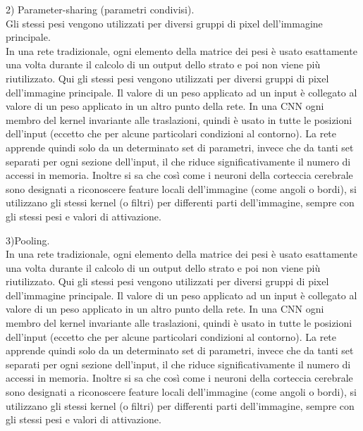 2) Parameter-sharing (parametri condivisi). \\
Gli stessi pesi vengono utilizzati per diversi gruppi di pixel dell’immagine principale.\\
In una rete tradizionale, ogni elemento della matrice dei pesi è usato esattamente
 una volta durante il calcolo di un output dello strato e poi non viene più riutilizzato. Qui gli stessi pesi vengono utilizzati per diversi gruppi di pixel dell’immagine principale. Il valore di un peso applicato ad un input è collegato al valore di un peso applicato in un altro punto della rete. In una CNN ogni membro del kernel invariante alle traslazioni, quindi è usato in tutte le posizioni dell’input (eccetto che per alcune particolari condizioni al contorno). La rete apprende quindi solo da un determinato set di parametri, invece che da tanti set separati per ogni sezione dell’input, il che riduce significativamente il numero di accessi in memoria.  Inoltre si sa che così come i neuroni della corteccia cerebrale sono designati a riconoscere feature locali dell’immagine (come angoli o bordi), si utilizzano gli stessi kernel (o filtri) per differenti parti dell’immagine, sempre con gli stessi pesi e valori di attivazione. 

3)Pooling.\\
In una rete tradizionale, ogni elemento della matrice dei pesi è usato esattamente una volta durante il calcolo di un output dello strato e poi non viene più riutilizzato. Qui gli stessi pesi vengono utilizzati per diversi gruppi di pixel dell’immagine principale. Il valore di un peso applicato ad un input è collegato al valore di un peso applicato in un altro punto della rete. In una CNN ogni membro del kernel invariante alle traslazioni, quindi è usato in tutte le posizioni dell’input (eccetto che per alcune particolari condizioni al contorno). La rete apprende quindi solo da un determinato set di parametri, invece che da tanti set separati per ogni sezione dell’input, il che riduce significativamente il numero di accessi in memoria.  Inoltre si sa che così come i neuroni della corteccia cerebrale sono designati a riconoscere feature locali dell’immagine (come angoli o bordi), si utilizzano gli stessi kernel (o filtri) per differenti parti dell’immagine, sempre con gli stessi pesi e valori di attivazione. 




